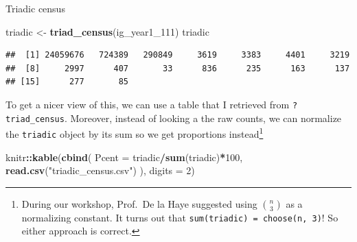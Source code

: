 \documentclass[]{book}
\newenvironment{Shaded}{\begin{snugshade}}{\end{snugshade}}
\newcommand{\KeywordTok}[1]{\textcolor[rgb]{0.13,0.29,0.53}{\textbf{#1}}}
\newcommand{\DataTypeTok}[1]{\textcolor[rgb]{0.13,0.29,0.53}{#1}}
\newcommand{\DecValTok}[1]{\textcolor[rgb]{0.00,0.00,0.81}{#1}}
\newcommand{\StringTok}[1]{\textcolor[rgb]{0.31,0.60,0.02}{#1}}
\newcommand{\OperatorTok}[1]{\textcolor[rgb]{0.81,0.36,0.00}{\textbf{#1}}}
\newcommand{\NormalTok}[1]{#1}
\let\rmarkdownfootnote\footnote%
\def\footnote{\protect\rmarkdownfootnote}
\theoremstyle{definition}
\theoremstyle{definition}
\theoremstyle{definition}
\theoremstyle{remark}
\begin{document}
Triadic census

\begin{Shaded}
\begin{Highlighting}[]
\NormalTok{triadic <-}\StringTok{ }\KeywordTok{triad_census}\NormalTok{(ig_year1_}\DecValTok{111}\NormalTok{)}
\NormalTok{triadic}
\end{Highlighting}
\end{Shaded}

\begin{verbatim}
##  [1] 24059676   724389   290849     3619     3383     4401     3219
##  [8]     2997      407       33      836      235      163      137
## [15]      277       85
\end{verbatim}

To get a nicer view of this, we can use a table that I retrieved from
\texttt{?triad\_census}. Moreover, instead of looking a the raw counts,
we can normalize the \texttt{triadic} object by its sum so we get
proportions instead\footnote{During our workshop, Prof.~De la Haye
  suggested using \({n \choose 3}\) as a normalizing constant. It turns
  out that \texttt{sum(triadic)\ =\ choose(n,\ 3)}! So either approach
  is correct.}

\begin{Shaded}
\begin{Highlighting}[]
\NormalTok{knitr}\OperatorTok{::}\KeywordTok{kable}\NormalTok{(}\KeywordTok{cbind}\NormalTok{(}
  \DataTypeTok{Pcent =}\NormalTok{ triadic}\OperatorTok{/}\KeywordTok{sum}\NormalTok{(triadic)}\OperatorTok{*}\DecValTok{100}\NormalTok{,}
  \KeywordTok{read.csv}\NormalTok{(}\StringTok{"triadic_census.csv"}\NormalTok{)}
\NormalTok{  ), }\DataTypeTok{digits =} \DecValTok{2}\NormalTok{)}
\end{Highlighting}
\end{Shaded}
\end{document}
